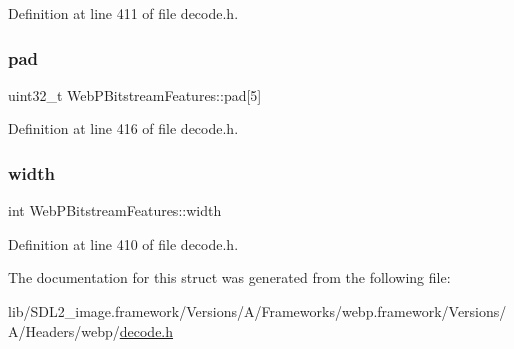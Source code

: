 Definition at line 411 of file decode.\+h.

\mbox{\label{struct_web_p_bitstream_features_aa59bdd4c454c2e2514cb97dbfe562ee7}} 
\subsubsection{\texorpdfstring{pad}{pad}}
{\footnotesize\ttfamily uint32\+\_\+t Web\+P\+Bitstream\+Features\+::pad\mbox{[}5\mbox{]}}



Definition at line 416 of file decode.\+h.

\mbox{\label{struct_web_p_bitstream_features_a2ca102ea828b5b58d03138e059890c5e}} 
\subsubsection{\texorpdfstring{width}{width}}
{\footnotesize\ttfamily int Web\+P\+Bitstream\+Features\+::width}



Definition at line 410 of file decode.\+h.



The documentation for this struct was generated from the following file\+:\begin{DoxyCompactItemize}
\item 
lib/\+S\+D\+L2\+\_\+image.\+framework/\+Versions/\+A/\+Frameworks/webp.\+framework/\+Versions/\+A/\+Headers/webp/\mbox{\hyperlink{decode_8h}{decode.\+h}}\end{DoxyCompactItemize}
